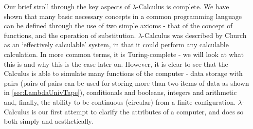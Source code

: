 \documentclass[Master.tex]{subfiles}
\begin{document}
Our brief stroll through the key aspects of $\lambda$-Calculus is complete. We have shown that many basic necessary concepts in a common programming language can be defined through the use of two simple axioms - that of the concept of functions, and the operation of substitution. $\lambda$-Calculus was described by Church as an `effectively calculable' system, in that it could perform any calculable calculation. In more common terms, it is Turing-complete - we will look at what this is and why this is the case later on. However, it is clear to see that the Calculus is able to simulate many functions of the computer - data storage with pairs (pairs of pairs can be used for storing more than two items of data as shown in \cref{sec:LambdaUnivTape}), conditionals and booleans, integers and arithmetic and, finally, the ability to be continuous (circular) from a finite configuration. $\lambda$-Calculus is our first attempt to clarify the attributes of a computer, and does so both simply and aesthetically.
\end{document}
